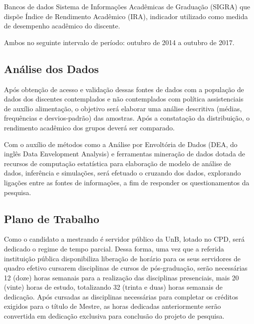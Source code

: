 Bancos de dados Sistema de Informações Acadêmicas de Graduação (SIGRA) que dispõe Índice de Rendimento Acadêmico (IRA), indicador utilizado como medida de desempenho acadêmico do discente. 

Ambos no seguinte intervalo de período: outubro de 2014 a outubro de 2017.


\subsection{Análise dos Dados}

Após obtenção de acesso e validação dessas fontes de dados com a população de dados dos discentes contemplados e não contemplados com política assistenciais de auxílio alimentação, o objetivo será elaborar uma análise descritiva (médias, frequências e desvios-padrão) das amostras. Após a constatação da distribuição, o rendimento acadêmico dos grupos deverá ser comparado. 

Com o auxílio de métodos como a Análise por Envoltória de Dados (DEA, do inglês Data Envelopment Analysis) e ferramentas mineração de dados dotada de recursos de computação estatística para elaboração de modelo de análise de dados, inferência e simulações, será efetuado o cruzando dos dados, explorando ligações entre as fontes de informações, a fim de responder os questionamentos da pesquisa.


\subsection{Plano de Trabalho}

Como o candidato a mestrando é servidor público da UnB, lotado no CPD, será dedicado o regime de tempo parcial. Dessa forma, uma vez que a referida instituição pública disponibiliza liberação de horário para os seus servidores de quadro efetivo cursarem disciplinas de cursos de pós-graduação, serão necessárias 12 (doze) horas semanais para a realização das disciplinas presenciais, mais 20 (vinte) horas de estudo, totalizando 32 (trinta e duas) horas semanais de dedicação. Após cursadas as disciplinas necessárias para completar os créditos exigidos para o título de Mestre, as horas dedicadas anteriormente serão convertida em dedicação exclusiva para conclusão do projeto de pesquisa.

